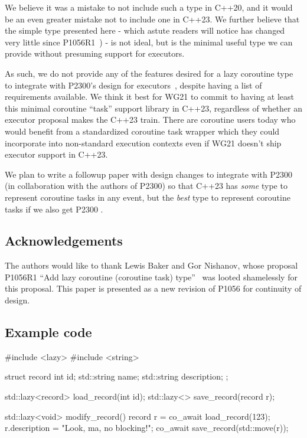 We believe it was a mistake to not include such a type in C++20,
and it would be an even greater mistake not to include one in C++23.
We further believe that the simple type presented here
- which astute readers will notice
has changed very little since P1056R1~\cite{P1056R1}) -
is not ideal, but is the minimal useful type we can provide
without presuming support for executors.

As such, we do not provide any of the features
desired for a lazy coroutine type to integrate with
P2300's design for executors~\cite{P2300R3},
despite having a list of requirements available.
We think it best for WG21 to commit to having at least this minimal
coroutine ``task'' support library in C++23,
regardless of whether an executor proposal makes the C++23 train.
There are coroutine users today who would benefit
from a standardized coroutine task wrapper
which they could incorporate into non-standard execution contexts
even if WG21 doesn't ship executor support in C++23.

We plan to write a followup paper with design changes to integrate
 with P2300 (in collaboration with the authors of P2300)
so that C++23 has \emph{some} type to represent coroutine tasks in any event,
but the \emph{best} type to represent coroutine tasks if we also get
P2300 .

\subsection{Acknowledgements}

The authors would like to thank Lewis Baker and Gor Nishanov,
whose proposal
P1056R1 ``Add lazy coroutine (coroutine task) type''~\cite{P1056R1}
was looted shamelessly for this proposal.
This paper is presented as a new revision of
P1056 for continuity of design.

\subsection{Example code}

\begin{codeblock}
#include <lazy>
#include <string>

struct record {
  int id;
  std::string name;
  std::string description;
};

std::lazy<record> load_record(int id);
std::lazy<> save_record(record r);

std::lazy<void> modify_record() {
  record r = co_await load_record(123);
  r.description = "Look, ma, no blocking!";
  co_await save_record(std::move(r));
}
\end{codeblock}

